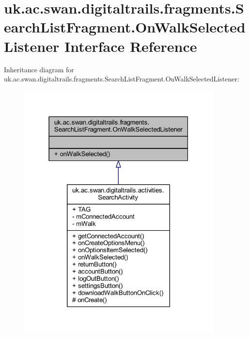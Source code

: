 \hypertarget{interfaceuk_1_1ac_1_1swan_1_1digitaltrails_1_1fragments_1_1_search_list_fragment_1_1_on_walk_selected_listener}{\section{uk.\+ac.\+swan.\+digitaltrails.\+fragments.\+Search\+List\+Fragment.\+On\+Walk\+Selected\+Listener Interface Reference}
\label{interfaceuk_1_1ac_1_1swan_1_1digitaltrails_1_1fragments_1_1_search_list_fragment_1_1_on_walk_selected_listener}
}


Inheritance diagram for uk.\+ac.\+swan.\+digitaltrails.\+fragments.\+Search\+List\+Fragment.\+On\+Walk\+Selected\+Listener\+:
\nopagebreak
\begin{figure}[H]
\begin{center}
\leavevmode
\includegraphics[width=295pt]{interfaceuk_1_1ac_1_1swan_1_1digitaltrails_1_1fragments_1_1_search_list_fragment_1_1_on_walk_selected_listener__inherit__graph}
\end{center}
\end{figure}


